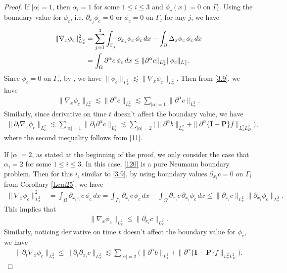 \documentclass[reqno,a4paper]{amsart}
\numberwithin{equation}{section}
\newcommand{\1}{\mathbf{1}}
\renewcommand{\P}{\mathbf{P}}
\newcommand{\pa}{\partial}
\newcommand{\na}{\nabla}
\newcommand{\<}{\langle}
\renewcommand{\>}{\rangle}
\newcommand{\I}{\mathbf{I}}
\renewcommand{\P}{\mathbf{P}}
\begin{document}
\begin{proof}
If $|\alpha| = 1$, then $\alpha_i=1$ for some $1\le i\le 3$ and $\phi_c(x)=0$ on $\Gamma_i$.
Using the boundary value for $\phi_c$, i.e. $\partial_{x_j}\phi_c=0$ or $\phi_c=0$ on $\Gamma_j$ for any $j$, we have 
\begin{align}\label{3.9}\notag
	\|\na_x\phi_c\|^2_{L^2_x} &= \sum_{j=1}^3\int_{\Gamma_j}\partial_{x_j}\phi_c\,\phi_c\,dx - \int_{\Omega}\Delta_x\phi_c\,\phi_c\,dx\\
	&= \int_{\Omega}\partial^\alpha c\,\phi_c\,dx \le \|\partial^\alpha c\|_{L^2_x}\|\phi_c\|_{L^2_x}.
\end{align}
Since $\phi_c =0$ on $\Gamma_i$, by \cite[Theorem 6.7-5]{Ciarlet2013}, we have $\|\phi_c\|_{L^2_x}\lesssim \|\na_x\phi_c\|_{L^2_x}$. Then from \eqref{3.9}, we have 
\begin{align}\label{3.10}
	\|\na_x\phi_c\|_{L^2_x}\lesssim \|\partial^\alpha c\|_{L^2_x}\lesssim \sum_{|\alpha|=1}\|\partial^\alpha c\|_{L^2_x}.
\end{align}
Similarly, since derivative on time $t$ doesn't affect the boundary value, we have 
\begin{align}\label{3.11}
	\|\partial_t\na_x\phi_c\|_{L^2_x}\lesssim \sum_{|\alpha|=1}\|\partial_t\partial^\alpha c\|_{L^2_x}\lesssim \sum_{|\alpha|=2}\Big(\|\partial^\alpha b\|_{L^2_x}+\|\pa^\alpha\{\I-\P\}f\|_{L^2_xL^2_D}\Big), 
\end{align}
where the second inequality follows from \eqref{11}. 

If $|\alpha|=2$, as stated at the beginning of the proof, we only consider the case that $\alpha_i=2$ for some $1\le i\le 3$. In this case, \eqref{120} is a pure Neumann boundary problem. Then for this $i$, similar to \eqref{3.9}, by using boundary values $\partial_{x_i}c=0$ on $\Gamma_i$ from Corollary \ref{Lem25}, we have 
\begin{align*}
	\|\na_x\phi_c\|^2_{L^2_x}
	&= \int_{\Omega}\partial_{x_ix_i} c\,\phi_c\,dx = \int_{\Gamma_i}\partial_{x_i}c\,\phi_c\,dx - \int_{\Omega}\partial_{x_i}c\,\partial_{x_i}\phi_c\,dx
	\le \|\partial_{x_i}c\|_{L^2_x}\|\partial_{x_i}\phi_c\|_{L^2_x}.
\end{align*}
This implies that 
\begin{align}\label{3.12}
	\|\na_x\phi_c\|_{L^2_x}\le \|\partial_{x_i}c\|_{L^2_x}.
\end{align}
Similarly, noticing derivative on time $t$ doesn't affect the boundary value for $\phi_c$, we have 
\begin{align}\label{3.13}
	\|\partial_t\na_x\phi_c\|_{L^2_x}\le \|\partial_t\partial_{x_i}c\|_{L^2_x}\lesssim \sum_{|\alpha|=2}\Big(\|\partial^\alpha b\|_{L^2_x}+\|\pa^\alpha\{\I-\P\}f\|_{L^2_xL^2_D}\Big).
\end{align}




\end{proof}
\end{document}
